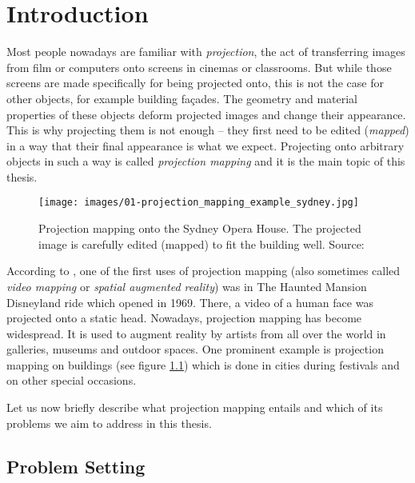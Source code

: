 \chapter{Introduction}
\label{chapter:intro}


Most people nowadays are familiar with \textit{projection}, the act of transferring images from film or computers onto screens in cinemas or classrooms. But while those screens are made specifically for being projected onto, this is not the case for other objects, for example building façades. The geometry and material properties of these objects deform projected images and change their appearance. This is why projecting them is not enough -- they first need to be edited (\textit{mapped}) in a way that their final appearance is what we expect. Projecting onto arbitrary objects in such a way is called \textit{projection mapping} and it is the main topic of this thesis.

\begin{figure}[ht]
    \begin{center}
        \texttt{[image: images/01-projection\_mapping\_example\_sydney.jpg]}
        \caption{Projection mapping onto the Sydney Opera House. The projected image is carefully edited (mapped) to fit the building well. Source: \citet{ImageProjectionMappingExampleSydney}}
        \label{fig:intro_example_sydney}
    \end{center}
\end{figure}

According to \citet*{WikiHauntedMansion}, one of the first uses of projection mapping (also sometimes called \textit{video mapping} or \textit{spatial augmented reality}) was in The Haunted Mansion Disneyland ride which opened in 1969. There, a video of a human face was projected onto a static head. Nowadays, projection mapping has become widespread. It is used to augment reality by artists from all over the world in galleries, museums and outdoor spaces. One prominent example is projection mapping on buildings (see figure \ref{fig:intro_example_sydney}) which is done in cities during festivals and on other special occasions.

Let us now briefly describe what projection mapping entails and which of its problems we aim to address in this thesis.

\section{Problem Setting}
\label{section:intro-problem_setting}

